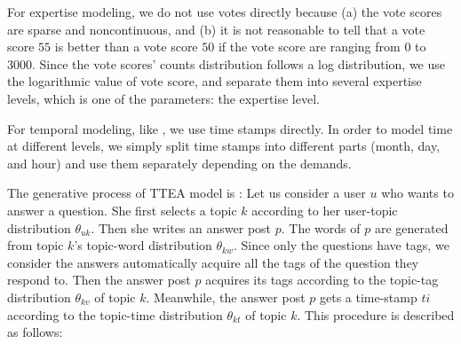 {{{{{{{For expertise modeling, we do not use votes directly because (a) the vote scores are sparse and noncontinuous, and (b) it is not reasonable to tell that a vote score $55$ is better than a vote score $50$ if the vote score are ranging from $0$ to $3000$.  Since the vote scores' counts distribution follows a log distribution\cite{yang2013cqarank}, we use the logarithmic value of vote score, and separate them into several expertise levels, which is one of the parameters: the expertise level.

For temporal modeling, like \cite{wang2006topics} \cite{hu2014user}, we use time stamps directly. In order to model time at different levels, we simply split time stamps into different parts (month, day, and hour) and use them separately depending on the demands.



The generative process of TTEA model is :
Let us consider a user $u$ who wants to answer a question. She first selects a topic $k$ according to her user-topic distribution $\theta_{uk}$. Then she writes an answer post $p$. The words of $p$ are generated from topic $k$'s topic-word distribution $\theta_{kw}$. Since only the questions have tags, we consider the answers automatically acquire all the tags of the question they respond to. Then the answer post $p$ acquires its tags according to the topic-tag distribution $\theta_{kv}$ of topic $k$. Meanwhile, the answer post $p$ gets a time-stamp $ti$ according to the topic-time distribution $\theta_{kt}$ of topic $k$.
This procedure is described as follows:


}}}}}}}
